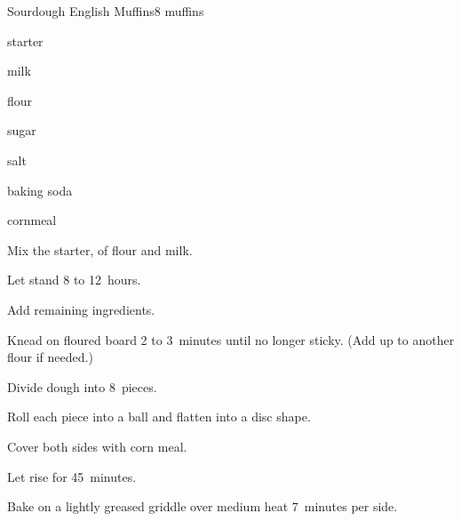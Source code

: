 \begin{recipe}{Sourdough English Muffins}{}{8 muffins}

\begin{ingredients}
\item \C{\half} starter
\item {} milk
\item \C{2 \half} flour
\item {} sugar
\item \tp{\threequarter} salt
\item \tp{\half} baking soda
\item cornmeal
\end{ingredients}

\begin{directions}
\item Mix the starter,  of flour and milk.
\item Let stand 8 to 12~hours.
\item Add remaining ingredients.
\item Knead on floured board 2 to 3~minutes until no longer sticky. (Add up to another \C{\quarter} flour if needed.)
\item Divide dough into 8~pieces.
\item Roll each piece into a ball and flatten into a disc shape.
\item Cover both sides with corn meal.
\item Let rise for 45~minutes.
\item Bake on a lightly greased griddle over medium heat 7~minutes per side. 
\end{directions}

\end{recipe}

